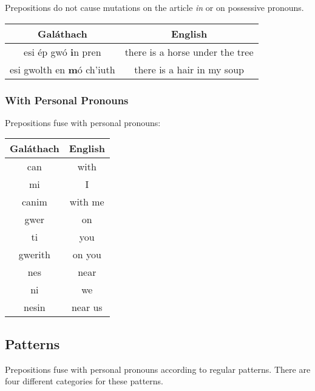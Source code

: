Prepositions do not cause mutations on the article \textit{in} or on possessive pronouns.
\begin{table}[H]
\centering
\begin{tabu}{c|c}
  \textbf{Gal\'{a}thach} & \textbf{English}\\
  \toprule
  esi \'{e}p gw\'{o} \textbf{i}n pren & there is a horse under the tree\\
  esi gwolth en \textbf{m}\'{o} ch'iuth & there is a hair in my soup
\end{tabu}
\label{examples_prepositions_no_mutation_on_in}
\end{table}

\subsubsection{With Personal Pronouns}

Prepositions fuse with personal pronouns:
\begin{table}[H]
\centering
\begin{tabu}{c|c}
  \textbf{Gal\'{a}thach} & \textbf{English}\\
  \toprule
  can & with\\
  mi & I\\
  canim & with me\\
  \midrule
  gwer & on\\
  ti & you\\
  gwerith & on you\\
  \midrule
  nes & near\\
  ni & we\\
  nesin & near us
\end{tabu}
\label{examples_prepositions_fusing}
\end{table}

\subsection{Patterns}

Prepositions fuse with personal pronouns according to regular patterns. There are four different categories for these patterns.


